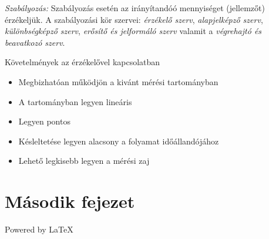\documentclass[a4paper,12pt]{book}
\begin{document}
\emph{Szabályozás:} Szabályozás esetén az irányítandóó mennyiséget (jellemzőt) érzékeljük. A szabályozási kör szervei: 
\emph{érzékelő szerv}, \emph{alapjelképző szerv}, \emph{különbségképző szerv}, \emph{erősítő és jelformáló szerv} valamit 
a \emph{végrehajtó és beavatkozó szerv}. 

Követelmények az érzékelővel kapcsolatban 
\begin{itemize}
\item{Megbizhatóan működjön a kivánt mérési tartományban}
\item{A tartományban legyen lineáris}
\item{Legyen pontos}
\item{Késleltetése legyen alacsony a folyamat időállandójához}
\item{Lehető legkisebb legyen a mérési zaj}
\end{itemize}


\chapter{Második fejezet}

Powered by \LaTeX
\end{document}
